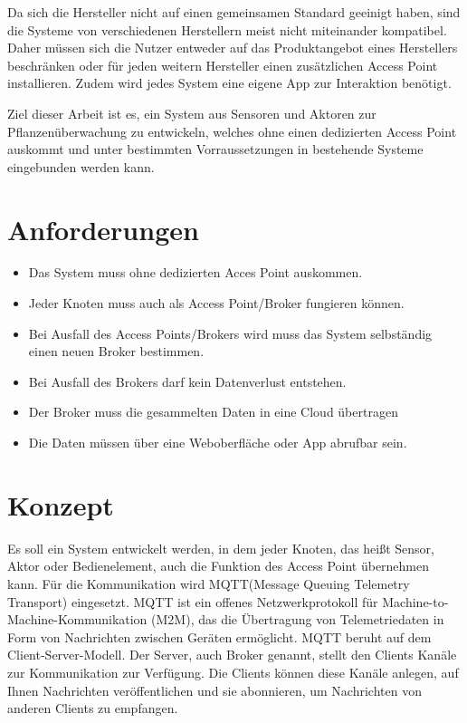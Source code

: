 \documentclass[conference]{IEEEtran}
\begin{document}
Da sich die Hersteller nicht auf einen gemeinsamen Standard geeinigt haben, sind die Systeme von verschiedenen Herstellern meist nicht miteinander kompatibel. Daher müssen sich die Nutzer entweder auf das Produktangebot eines Herstellers beschränken oder für jeden weitern Hersteller einen zusätzlichen Access Point installieren. Zudem wird jedes System eine eigene App zur Interaktion benötigt.

Ziel dieser Arbeit ist es, ein System aus Sensoren und Aktoren zur Pflanzenüberwachung zu entwickeln, welches ohne einen dedizierten Access Point auskommt und unter bestimmten Vorraussetzungen in bestehende Systeme eingebunden werden kann.
\section{Anforderungen}
\begin{itemize}
    \item Das System muss ohne dedizierten Acces Point auskommen.
    \item Jeder Knoten muss auch als Access Point/Broker fungieren können.
    \item Bei Ausfall des Access Points/Brokers wird muss das System selbständig einen neuen Broker bestimmen.
    \item Bei Ausfall des Brokers darf kein Datenverlust entstehen.
    \item Der Broker muss die gesammelten Daten in eine Cloud übertragen
    \item Die Daten müssen über eine Weboberfläche oder App abrufbar sein.

\end{itemize}
\section{Konzept}
Es soll ein System entwickelt werden, in dem jeder Knoten, das heißt Sensor, Aktor oder Bedienelement, auch die Funktion des Access Point übernehmen kann. Für die Kommunikation wird MQTT(Message Queuing Telemetry Transport) eingesetzt. MQTT ist ein offenes Netzwerkprotokoll für Machine-to-Machine-Kommunikation (M2M), das die Übertragung von Telemetriedaten in Form von Nachrichten zwischen Geräten ermöglicht.
MQTT beruht auf dem Client-Server-Modell. Der Server, auch Broker genannt, stellt den Clients Kanäle zur Kommunikation zur Verfügung. Die Clients können diese Kanäle anlegen, auf Ihnen Nachrichten veröffentlichen und sie abonnieren, um Nachrichten von anderen Clients zu empfangen. 
\end{document}
